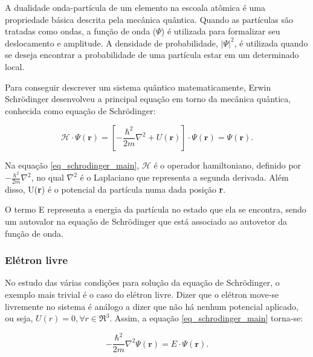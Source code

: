 \par A dualidade onda-partícula de um elemento na escoala atômica é uma propriedade básica descrita pela mecânica quântica\cite{qm_fis3}. Quando as partículas são tratadas como ondas, a função de onda ($\Psi$) é utilizada para formalizar seu deslocamento e amplitude\cite{qm_fis4}. A densidade de probabilidade, $\left| \Psi \right|^2$, é utilizada quando se deseja encontrar a probabilidade de uma partícula estar em um determinado local.

\par Para conseguir descrever um sistema quântico matematicamente, Erwin Schrödinger desenvolveu a principal equação em torno da mecânica quântica, conhecida como equação de Schrödinger:

\begin{equation}\label{eq_schrodinger_main}
  \mathcal{H} \cdot \Psi(\mathbf{r}) = \left[ -\frac{\hbar^2}{2m}\nabla^2 + U(\textbf{r}) \right] \cdot \Psi(\mathbf{r}) = \Psi(\mathbf{r}).
\end{equation}

\par Na equação \eqref{eq_schrodinger_main}, $\mathcal{H}$ é o operador hamiltoniano, definido por $ -\frac{\hbar^2}{2m}\nabla^2 $\cite{frustrado3}, no qual $\nabla^2$ é o Laplaciano que representa a segunda derivada. Além disso, U(\textbf{r}) é o potencial da partícula numa dada posição \textbf{r}.

\par O termo E representa a energia da partícula no estado que ela se encontra, sendo um autovalor na equação de Schrödinger que está associado ao autovetor da função de onda.


\subsubsection{Elétron livre}

  \par No estudo das várias condições para solução da equação de Schrödinger, o exemplo mais trivial é o caso do elétron livre. Dizer que o elétron move-se livremente no sistema é análogo a dizer que não há nenhum potencial aplicado, ou seja, $U(r) = 0,   \forall r \in \Re^3$. Assim, a equação \eqref{eq_schrodinger_main} torna-se:

  \begin{equation}\label{schrodinger_1}
    -\frac{\hbar^2}{2m}\nabla^2 \Psi(\mathbf{r}) = E \cdot \Psi(\mathbf{r}).
  \end{equation}

